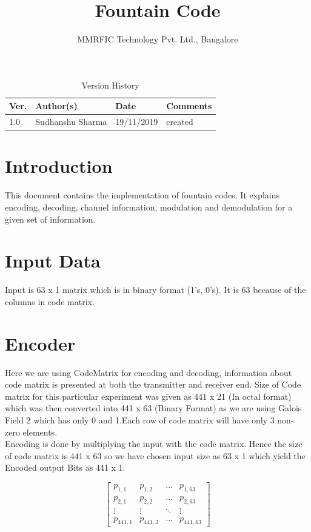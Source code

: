 \documentclass[12pt,a4paper,onecolumn]{article}
\author{MMRFIC Technology Pvt. Ltd., Bangalore}
\title{Fountain Code}
\begin{document}
\maketitle
\vfill

\begin{table}[h]
\begin{center}
\begin{tabular}{llll}
\hline
Ver. & Author(s) & Date & Comments \\
\hline \hline
1.0 & Sudhanshu Sharma & 19/11/2019 & created \\%
\hline
\end{tabular}
\caption{Version History}
\end{center}
\end{table}
\newpage
\tableofcontents
\newpage
\section{Introduction}
This document contains the implementation of fountain codes. It explains encoding, decoding, channel information, modulation and demodulation for a given set of information.
\section{Input Data}
Input is 63 x 1 matrix which is in binary format (1's, 0's). It is 63 because of the columns in code matrix. 
\section{Encoder}
Here we are using CodeMatrix for encoding and decoding, information about code matrix is presented at both the transmitter and receiver end. Size of Code matrix for this particular experiment was given as  441 x 21 (In octal format) which was then converted into 441 x 63 (Binary Format) as we are using Galois Field 2 which has only 0 and 1.Each row of code matrix will have only 3 non- zero elements.\\
Encoding is done by multiplying the input with the code matrix. Hence the size of code matrix is 441 x 63 so we have chosen input size as 63 x 1 which yield the Encoded output Bits as 441 x 1.
\begin{center}
\begin{equation}
\begin{bmatrix}
p_{1,1} & p_{1,2} & \ldots
& p_{1,63} \\
p_{2,1} & p_{2,2} & \ldots
& p_{2,63} \\
\vdots & \vdots & \ddots
& \vdots \\
p_{441,1} & p_{441,2} & \ldots
& p_{441,63}
\end{bmatrix}
\end{equation}

\end{center} 
\end{document}
